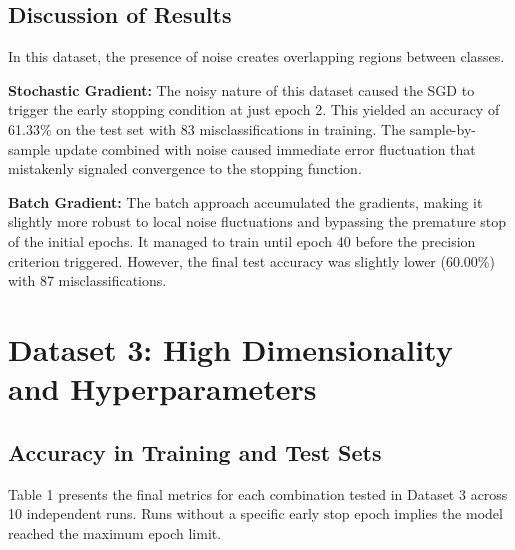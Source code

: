\documentclass[12pt, a4paper]{article}
\begin{document}
\subsection{Discussion of Results}
In this dataset, the presence of noise creates overlapping regions between classes.

\textbf{Stochastic Gradient:} The noisy nature of this dataset caused the SGD to trigger the early stopping condition at just epoch 2. This yielded an accuracy of 61.33\% on the test set with 83 misclassifications in training. The sample-by-sample update combined with noise caused immediate error fluctuation that mistakenly signaled convergence to the stopping function.

\textbf{Batch Gradient:} The batch approach accumulated the gradients, making it slightly more robust to local noise fluctuations and bypassing the premature stop of the initial epochs. It managed to train until epoch 40 before the precision criterion triggered. However, the final test accuracy was slightly lower (60.00\%) with 87 misclassifications.

\section{Dataset 3: High Dimensionality and Hyperparameters}

\subsection{Accuracy in Training and Test Sets}
Table 1 presents the final metrics for each combination tested in Dataset 3 across 10 independent runs. Runs without a specific early stop epoch implies the model reached the maximum epoch limit.
\end{document}
